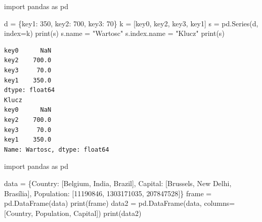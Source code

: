 \documentclass[
  polish,
  letterpaper,
  DIV=11,
  numbers=noendperiod]{scrreprt}
\newenvironment{Shaded}{\begin{snugshade}}{\end{snugshade}}
\newcommand{\BuiltInTok}[1]{\textcolor[rgb]{0.00,0.23,0.31}{#1}}
\newcommand{\DecValTok}[1]{\textcolor[rgb]{0.68,0.00,0.00}{#1}}
\newcommand{\ImportTok}[1]{\textcolor[rgb]{0.00,0.46,0.62}{#1}}
\newcommand{\NormalTok}[1]{\textcolor[rgb]{0.00,0.23,0.31}{#1}}
\newcommand{\OperatorTok}[1]{\textcolor[rgb]{0.37,0.37,0.37}{#1}}
\newcommand{\StringTok}[1]{\textcolor[rgb]{0.13,0.47,0.30}{#1}}
\begin{document}
\begin{Shaded}
\begin{Highlighting}[]
\ImportTok{import}\NormalTok{ pandas }\ImportTok{as}\NormalTok{ pd}

\NormalTok{d }\OperatorTok{=}\NormalTok{ \{}\StringTok{\textquotesingle{}key1\textquotesingle{}}\NormalTok{: }\DecValTok{350}\NormalTok{, }\StringTok{\textquotesingle{}key2\textquotesingle{}}\NormalTok{: }\DecValTok{700}\NormalTok{, }\StringTok{\textquotesingle{}key3\textquotesingle{}}\NormalTok{: }\DecValTok{70}\NormalTok{\}}
\NormalTok{k }\OperatorTok{=}\NormalTok{ [}\StringTok{\textquotesingle{}key0\textquotesingle{}}\NormalTok{, }\StringTok{\textquotesingle{}key2\textquotesingle{}}\NormalTok{, }\StringTok{\textquotesingle{}key3\textquotesingle{}}\NormalTok{, }\StringTok{\textquotesingle{}key1\textquotesingle{}}\NormalTok{]}
\NormalTok{s }\OperatorTok{=}\NormalTok{ pd.Series(d, index}\OperatorTok{=}\NormalTok{k)}
\BuiltInTok{print}\NormalTok{(s)}
\NormalTok{s.name }\OperatorTok{=} \StringTok{"Wartosc"}
\NormalTok{s.index.name }\OperatorTok{=} \StringTok{"Klucz"}
\BuiltInTok{print}\NormalTok{(s)}
\end{Highlighting}
\end{Shaded}

\begin{verbatim}
key0      NaN
key2    700.0
key3     70.0
key1    350.0
dtype: float64
Klucz
key0      NaN
key2    700.0
key3     70.0
key1    350.0
Name: Wartosc, dtype: float64
\end{verbatim}

\begin{Shaded}
\begin{Highlighting}[]
\ImportTok{import}\NormalTok{ pandas }\ImportTok{as}\NormalTok{ pd}

\NormalTok{data }\OperatorTok{=}\NormalTok{ \{}\StringTok{\textquotesingle{}Country\textquotesingle{}}\NormalTok{: [}\StringTok{\textquotesingle{}Belgium\textquotesingle{}}\NormalTok{, }\StringTok{\textquotesingle{}India\textquotesingle{}}\NormalTok{, }\StringTok{\textquotesingle{}Brazil\textquotesingle{}}\NormalTok{],}
        \StringTok{\textquotesingle{}Capital\textquotesingle{}}\NormalTok{: [}\StringTok{\textquotesingle{}Brussels\textquotesingle{}}\NormalTok{, }\StringTok{\textquotesingle{}New Delhi\textquotesingle{}}\NormalTok{, }\StringTok{\textquotesingle{}Brasília\textquotesingle{}}\NormalTok{],}
        \StringTok{\textquotesingle{}Population\textquotesingle{}}\NormalTok{: [}\DecValTok{11190846}\NormalTok{, }\DecValTok{1303171035}\NormalTok{, }\DecValTok{207847528}\NormalTok{]\}}
\NormalTok{frame }\OperatorTok{=}\NormalTok{ pd.DataFrame(data)}
\BuiltInTok{print}\NormalTok{(frame)}
\NormalTok{data2 }\OperatorTok{=}\NormalTok{ pd.DataFrame(data, columns}\OperatorTok{=}\NormalTok{[}\StringTok{\textquotesingle{}Country\textquotesingle{}}\NormalTok{, }\StringTok{\textquotesingle{}Population\textquotesingle{}}\NormalTok{, }\StringTok{\textquotesingle{}Capital\textquotesingle{}}\NormalTok{])}
\BuiltInTok{print}\NormalTok{(data2)}
\end{Highlighting}
\end{Shaded}
\end{document}
